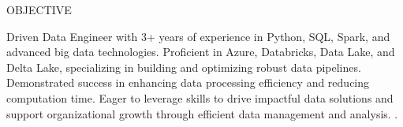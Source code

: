 \documentclass{resume} %
\begin{document}

\begin{rSection}{OBJECTIVE}

{Driven Data Engineer with 3+ years of experience in Python, SQL, Spark, and advanced big data technologies. Proficient in Azure, Databricks, Data Lake, and Delta Lake, specializing in building and optimizing robust data pipelines. Demonstrated success in enhancing data processing efficiency and reducing computation time. Eager to leverage skills to drive impactful data solutions and support organizational growth through efficient data management and analysis. .}


\end{rSection}
\end{document}
